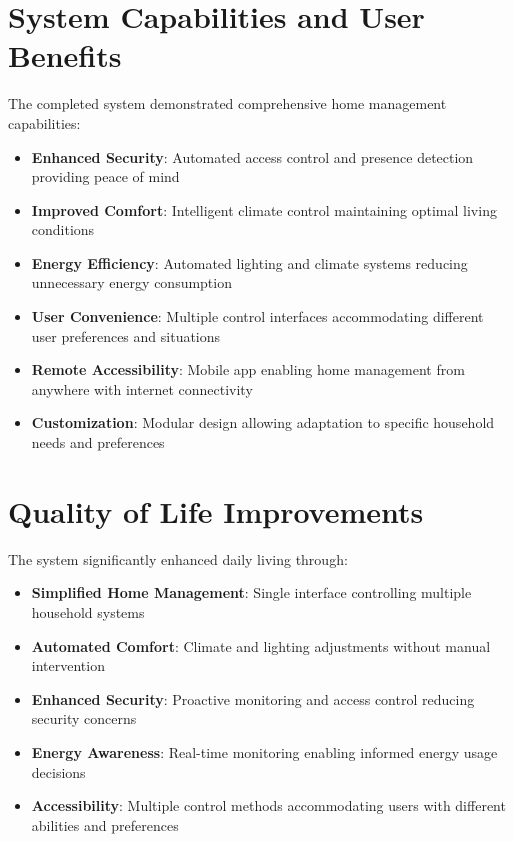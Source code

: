 \documentclass[12pt,a4paper]{report}
\begin{document}
\section{System Capabilities and User Benefits}

\noindent The completed system demonstrated comprehensive home management capabilities:

\begin{itemize}
\item \textbf{Enhanced Security}: Automated access control and presence detection providing peace of mind
\item \textbf{Improved Comfort}: Intelligent climate control maintaining optimal living conditions
\item \textbf{Energy Efficiency}: Automated lighting and climate systems reducing unnecessary energy consumption
\item \textbf{User Convenience}: Multiple control interfaces accommodating different user preferences and situations
\item \textbf{Remote Accessibility}: Mobile app enabling home management from anywhere with internet connectivity
\item \textbf{Customization}: Modular design allowing adaptation to specific household needs and preferences
\end{itemize}

\section{Quality of Life Improvements}

\noindent The system significantly enhanced daily living through:

\begin{itemize}
\item \textbf{Simplified Home Management}: Single interface controlling multiple household systems
\item \textbf{Automated Comfort}: Climate and lighting adjustments without manual intervention
\item \textbf{Enhanced Security}: Proactive monitoring and access control reducing security concerns
\item \textbf{Energy Awareness}: Real-time monitoring enabling informed energy usage decisions
\item \textbf{Accessibility}: Multiple control methods accommodating users with different abilities and preferences
\end{itemize}
\end{document}
